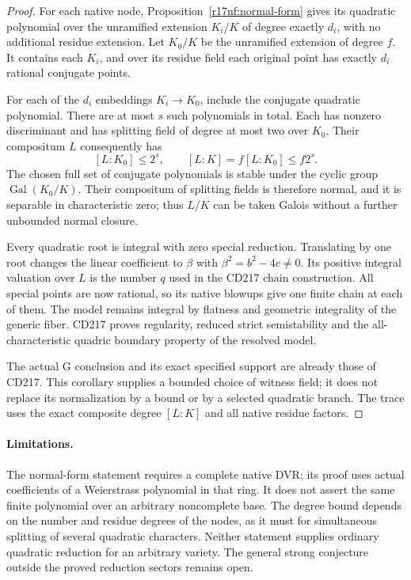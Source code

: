 \begin{proof}
For each native node, Proposition~\ref{r17nf:normal-form}
gives its quadratic polynomial over the unramified
extension $K_i/K$ of degree exactly $d_i$, with no
additional residue extension. Let $K_0/K$ be the
unramified extension of degree $f$. It contains each
$K_i$, and over its residue field each original point
has exactly $d_i$ rational conjugate points.

For each of the $d_i$ embeddings $K_i\to K_0$, include
the conjugate quadratic polynomial. There are at most
$s$ such polynomials in total. Each has nonzero
discriminant and has splitting field of degree at most
two over $K_0$. Their compositum $L$ consequently has
\[
                    [L:K_0]\le2^s,
                  \qquad [L:K]=f[L:K_0]\le f2^s.
\]
The chosen full set of conjugate polynomials is stable
under the cyclic group $\operatorname{Gal}(K_0/K)$.
Their compositum of splitting fields is therefore
normal, and it is separable in characteristic zero;
thus $L/K$ can be taken Galois without a further
unbounded normal closure.

Every quadratic root is integral with zero special
reduction. Translating by one root changes the linear
coefficient to $\beta$ with $\beta^2=b^2-4c\ne0$.
Its positive integral valuation over $L$ is the number
$q$ used in the CD217 chain construction. All special
points are now rational, so its native blowups give
one finite chain at each of them. The model remains
integral by flatness and geometric integrality of the
generic fiber. CD217 proves regularity, reduced strict
semistability and the all-characteristic quadric
boundary property of the resolved model.

The actual G conclusion and its exact specified
support are already those of CD217. This corollary
supplies a bounded choice of witness field; it does
not replace its normalization by a bound or by a
selected quadratic branch. The trace uses the exact
composite degree $[L:K]$ and all native residue factors.
\end{proof}

\paragraph{Limitations.}
The normal-form statement requires a complete native DVR;
its proof uses actual coefficients of a Weierstrass
polynomial in that ring. It does not assert the same
finite polynomial over an arbitrary noncomplete base.
The degree bound depends on the number and residue
degrees of the nodes, as it must for simultaneous
splitting of several quadratic characters. Neither
statement supplies ordinary quadratic reduction for
an arbitrary variety. The general strong conjecture
outside the proved reduction sectors remains open.
